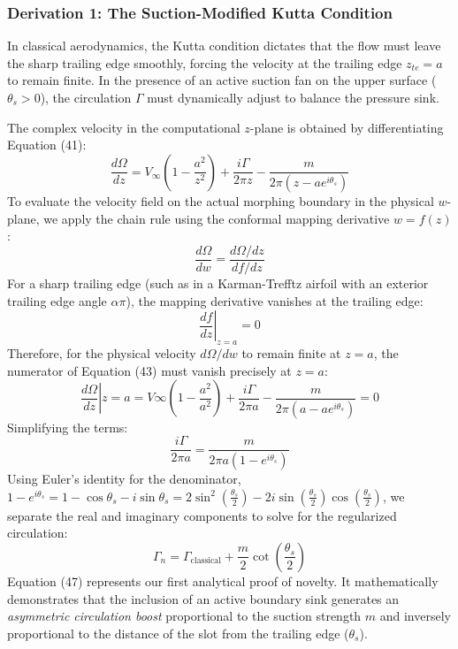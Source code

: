 \documentclass[12pt,a4paper]{article}
\begin{document}
\subsubsection{Derivation 1: The Suction-Modified Kutta Condition}
In classical aerodynamics, the Kutta condition dictates that the flow must leave the sharp trailing edge smoothly, forcing the velocity at the trailing edge $z_{te} = a$ to remain finite. In the presence of an active suction fan on the upper surface ($\theta_s > 0$), the circulation $\Gamma$ must dynamically adjust to balance the pressure sink. 

The complex velocity in the computational $z$-plane is obtained by differentiating Equation (41):
\begin{equation}
    \frac{d\Omega}{dz} = V_\infty \left( 1 - \frac{a^2}{z^2} \right) + \frac{i\Gamma}{2\pi z} - \frac{m}{2\pi (z - a e^{i\theta_s})}
\end{equation}
To evaluate the velocity field on the actual morphing boundary in the physical $w$-plane, we apply the chain rule using the conformal mapping derivative $w = f(z)$:
\begin{equation}
    \frac{d\Omega}{dw} = \frac{d\Omega/dz}{df/dz}
\end{equation}
For a sharp trailing edge (such as in a Karman-Trefftz airfoil with an exterior trailing edge angle $\alpha\pi$), the mapping derivative vanishes at the trailing edge:
\begin{equation}
    \left. \frac{df}{dz} \right|_{z = a} = 0
\end{equation}
Therefore, for the physical velocity $d\Omega/dw$ to remain finite at $z = a$, the numerator of Equation (43) must vanish precisely at $z = a$:
\begin{equation}
    \left. \frac{d\Omega}{dz} \right|{z = a} = V\infty \left( 1 - \frac{a^2}{a^2} \right) + \frac{i\Gamma}{2\pi a} - \frac{m}{2\pi (a - a e^{i\theta_s})} = 0
\end{equation}
Simplifying the terms:
\begin{equation}
    \frac{i\Gamma}{2\pi a} = \frac{m}{2\pi a (1 - e^{i\theta_s})}
\end{equation}
Using Euler's identity for the denominator, $1 - e^{i\theta_s} = 1 - \cos\theta_s - i\sin\theta_s = 2\sin^2(\frac{\theta_s}{2}) - 2i\sin(\frac{\theta_s}{2})\cos(\frac{\theta_s}{2})$, we separate the real and imaginary components to solve for the regularized circulation:
\begin{equation}
    \boxed{\Gamma_n = \Gamma_{\text{classical}} + \frac{m}{2} \cot\left(\frac{\theta_s}{2}\right)}
\end{equation}
Equation (47) represents our first analytical proof of novelty. It mathematically demonstrates that the inclusion of an active boundary sink generates an \textit{asymmetric circulation boost} proportional to the suction strength $m$ and inversely proportional to the distance of the slot from the trailing edge ($\theta_s$).
\end{document}
